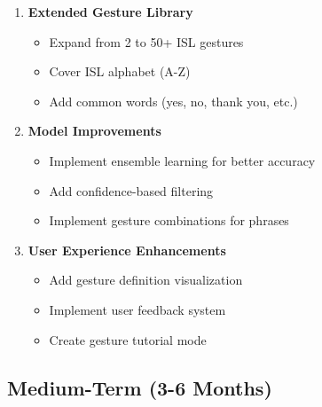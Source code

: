 \begin{enumerate}
    \item \textbf{Extended Gesture Library}
    \begin{itemize}
        \item Expand from 2 to 50+ ISL gestures
        \item Cover ISL alphabet (A-Z)
        \item Add common words (yes, no, thank you, etc.)
    \end{itemize}
    
    \item \textbf{Model Improvements}
    \begin{itemize}
        \item Implement ensemble learning for better accuracy
        \item Add confidence-based filtering
        \item Implement gesture combinations for phrases
    \end{itemize}
    
    \item \textbf{User Experience Enhancements}
    \begin{itemize}
        \item Add gesture definition visualization
        \item Implement user feedback system
        \item Create gesture tutorial mode
    \end{itemize}
\end{enumerate}

\subsection{Medium-Term (3-6 Months)}

